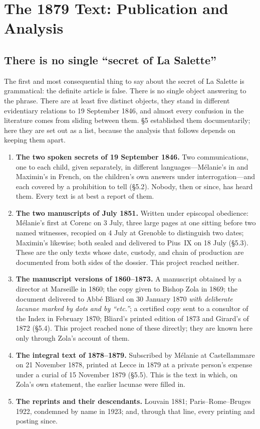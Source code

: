 \section{The 1879 Text: Publication and Analysis}

\subsection{There is no single ``secret of La Salette''}

The first and most consequential thing to say about the secret of La
Salette is grammatical: the definite article is false. There is no
single object answering to the phrase. There are at least five
distinct objects, they stand in different evidentiary relations to
19 September 1846, and almost every confusion in the literature
comes from sliding between them. \S5 established them
documentarily; here they are set out as a list, because the analysis
that follows depends on keeping them apart.

\begin{enumerate}[leftmargin=1.4em,itemsep=0.35em,topsep=0.35em]
\item \textbf{The two spoken secrets of 19 September 1846.} Two
communications, one to each child, given separately, in different
languages---Mélanie's in  and Maximin's in French, on
the children's own answers under interrogation---and each covered by
a prohibition to tell (\S5.2). Nobody, then or since, has heard
them. Every text is at best a report of them.
\item \textbf{The two manuscripts of July 1851.} Written under
episcopal obedience: Mélanie's first at Corenc on 3 July, three
large pages at one sitting before two named witnesses, recopied on 4
July at Grenoble to distinguish two dates; Maximin's likewise;
both sealed and delivered to Pius~IX on 18 July (\S5.3). These are
the only texts whose date, custody, and chain of production are
documented from both sides of the dossier. This project reached
neither.
\item \textbf{The manuscript versions of 1860--1873.} A manuscript
obtained by a director at Marseille in 1860; the copy given to
Bishop Zola in 1869; the document delivered to Abbé Bliard on 30
January 1870 \emph{with deliberate lacunae marked by dots and by
``etc.''}; a certified copy sent to a consultor of the Index in
February 1870; Bliard's printed edition of 1873 and Girard's of 1872
(\S5.4). This project reached none of these directly; they are known
here only through Zola's account of them.
\item \textbf{The integral text of 1878--1879.} Subscribed by
Mélanie at Castellammare on 21 November 1878, printed at Lecce in
1879 at a private person's expense under a curial  of 15 November 1879 (\S5.5). This is the text in
which, on Zola's own statement, the earlier lacunae were filled in.
\item \textbf{The reprints and their descendants.} Louvain 1881;
Paris--Rome--Bruges 1922, condemned by name in 1923; and, through
that line, every printing and posting since.
\end{enumerate}

